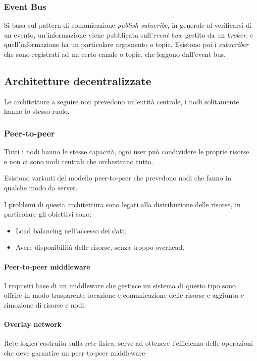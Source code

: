 \subsubsection{Event Bus}
Si basa sul pattern di comunicazione \emph{publish-subscribe}, in generale
al verificarsi di un evento, un'informazione viene pubblicata sull'\emph{event bus}, 
gestito da un \emph{broker}, e quell'informazione ha un particolare argomento 
o topic.
Esistono poi i \emph{subscriber} che sono registrati ad un certo canale o topic, 
che leggono dall'event bus.

\subsection{Architetture decentralizzate}
Le architetture a seguire non prevedono un'entità centrale, i nodi solitamente 
hanno lo stesso ruolo.

\subsubsection{Peer-to-peer}
Tutti i nodi hanno le stesse capacità, ogni user può condividere le proprie
risorse e non ci sono nodi centrali che orchestrano tutto.

Esistono varianti del modello peer-to-peer che prevedono nodi che fanno in 
qualche modo da server.

I problemi di questa architettura sono legati alla distribuzione delle risorse, 
in particolare gli obiettivi sono:
\begin{itemize}
    \item Load balancing nell'accesso dei dati;
    \item Avere disponibilità delle risorse, senza troppo overhead.
\end{itemize}

\paragraph{Peer-to-peer middleware}
I requisiti base di un middleware che gestisce un sistema di questo tipo sono offrire 
in modo trasparente locazione e comunicazione 
delle risorse e aggiunta e rimozione di risorse e nodi.

\paragraph{Overlay network}
Rete logica costruita sulla rete fisica, serve ad ottenere l'efficienza
delle operazioni che deve garantire un peer-to-peer middleware.

